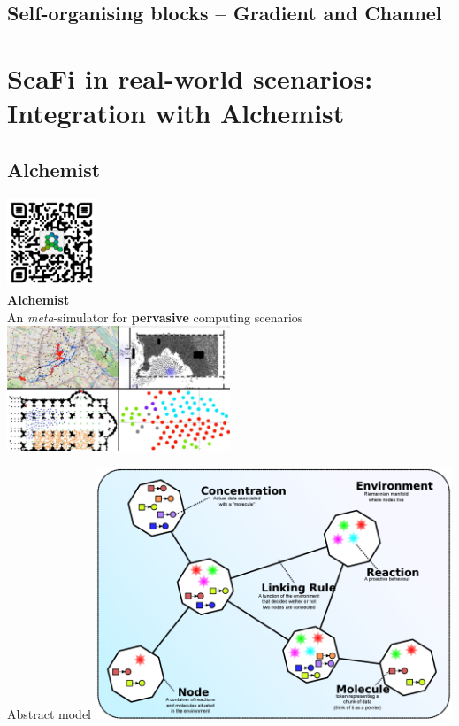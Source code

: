 \documentclass[presentation, 8pt]{beamer}\mode<presentation>{\usetheme{AMSBolognaFC}}
\begin{document}
\subsection{Self-organising blocks -- Gradient and Channel}
\section{ScaFi in real-world scenarios: Integration with Alchemist}
\subsection{Alchemist}
\begin{frame}[c, plain]
\begin{center}
	\includegraphics[width=0.2\textwidth]{img/qr-code.png}\\
	\Huge \textbf{Alchemist}\\
	{\large An  \emph{meta}-simulator for \textbf{pervasive} computing scenarios}\\[0.3cm]
	\includegraphics[width=0.5\textwidth]{img/alchemist-recap.png}
\end{center}
\end{frame}
\begin{frame}{Abstract model}
\centering
\includegraphics[width=0.8\textwidth]{img/abstract-model.png}
\end{frame}
\end{document}
